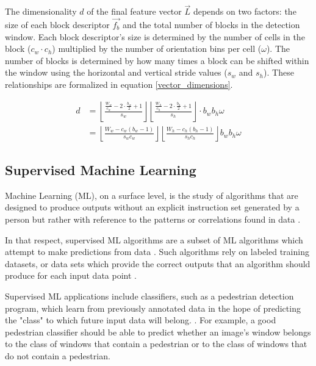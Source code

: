 The dimensionality $d$ of the final feature vector $\vec{L}$ depends on two factors: the size of each block descriptor $\vec{f_b}$ and the total number of blocks in the detection window. Each block descriptor's size is determined by the number of cells in the block ($c_w\cdot c_h$) multiplied by the number of orientation bins per cell ($\omega$). The number of blocks is determined by how many times a block can be shifted within the window using the horizontal and vertical stride values ($s_w$ and $s_h$). These relationships are formalized in equation \ref{vector_dimensions}.

\begin{equation}
    \label{vector_dimensions}
    \begin{split}
    d &= \left\lfloor \frac{\frac{W_w}{c_w}-2\cdot\frac{b_w}{2}+1}{s_w} \right\rfloor\left\lfloor \frac{\frac{W_h}{c_h}-2\cdot\frac{b_h}{2}+1}{s_h} \right\rfloor\cdot b_w b_h\omega \\ &= \left\lfloor  \frac{W_w- c_w(b_w-1)}{s_w c_w}  \right\rfloor \left\lfloor   \frac{W_h -c_h(b_h -1)}{s_h c_h} \right\rfloor b_w b_h\omega
    \end{split}
\end{equation}

\subsection{Supervised Machine Learning}\label{sec:supervised_ml}

Machine Learning (ML), on a surface level, is the study of algorithms that are designed to produce outputs without an explicit instruction set generated by a person but rather with reference to the patterns or correlations found in data \cite{what_is_ml}. 

In that respect, supervised ML algorithms are a subset of ML algorithms which attempt to make predictions from data \cite{supervised_learning}. Such algorithms rely on labeled training datasets, or data sets which provide the correct outputs that an algorithm should produce for each input data point \cite {supervised_learning}. 

Supervised ML applications include classifiers, such as a pedestrian detection program, which learn from previously annotated data in the hope of predicting the "class" to which future input data will belong. \cite{derek_2020_svm}. For example, a good pedestrian classifier should be able to predict whether an image's window belongs to the class of windows that contain a pedestrian or to the class of windows that do not contain a pedestrian.


